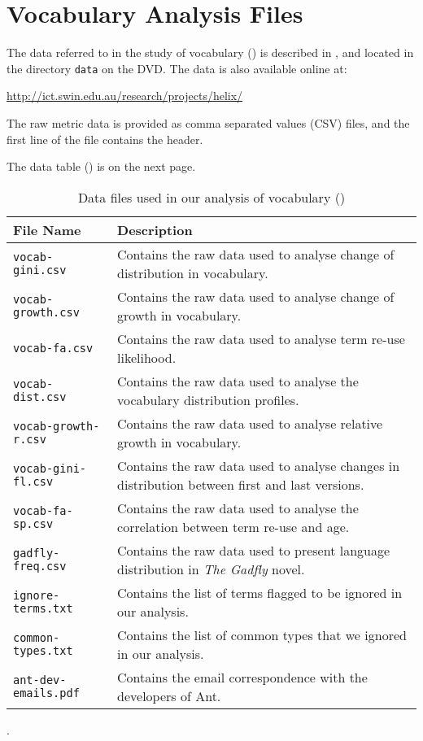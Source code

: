 \appendix

\chapter{Vocabulary Analysis Files} %
\label{cha:vocabulary_analysis_files}

The data referred to in the study of vocabulary () is described in , and located in the directory \texttt{data} on the DVD. The data is also available online at: 
\vspace{-0.5cm}

\url{http://ict.swin.edu.au/research/projects/helix/}

The raw metric data is provided as comma separated values (CSV) files, and the first line of the file contains the header.

The data table () is on the next page.

\begin{table}[t]
\vspace{-3.0cm}
\centering
\begin{tabular}{|l|p{}|}
\hline
{\bf File Name}  & {\bf Description} \\
\hline \hline 
\texttt{vocab-gini.csv} & Contains the raw data used to analyse change of distribution in vocabulary. \\
\hline
\texttt{vocab-growth.csv} & Contains the raw data used to analyse change of growth in vocabulary. \\
\hline
\texttt{vocab-fa.csv} & Contains the raw data used to analyse term re-use likelihood. \\
\hline
\texttt{vocab-dist.csv} & Contains the raw data used to analyse the vocabulary distribution profiles. \\
\hline
\texttt{vocab-growth-r.csv} & Contains the raw data used to analyse relative growth in vocabulary. \\
\hline
\texttt{vocab-gini-fl.csv} & Contains the raw data used to analyse changes in distribution between first and last versions. \\
\hline
\texttt{vocab-fa-sp.csv} & Contains the raw data used to analyse the correlation between term re-use and age. \\
\hline
\texttt{gadfly-freq.csv} & Contains the raw data used to present language distribution in \emph{The Gadfly} novel. \\
\hline
\texttt{ignore-terms.txt} & Contains the list of terms flagged to be ignored in our analysis. \\
\hline
\texttt{common-types.txt} & Contains the list of common types that we ignored in our analysis. \\
\hline
\texttt{ant-dev-emails.pdf} & Contains the email correspondence with the developers of Ant. \\
\hline

\end{tabular}
\caption{Data files used in our analysis of vocabulary ()}.
\label{tab:analysis_files}
\end{table}

